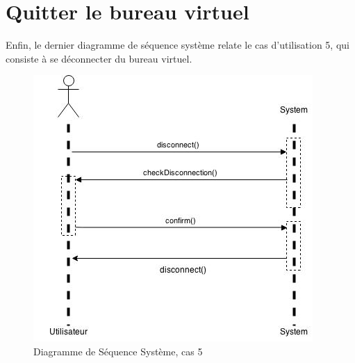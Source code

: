 \section{Quitter le bureau virtuel}

Enfin, le dernier diagramme de séquence système relate le cas d'utilisation
5, qui consiste à se déconnecter du bureau virtuel.

\begin{figure}[h!]
	\centering
	\includegraphics[scale=0.4]{diagrammes/DSS5.jpg}
	\caption{Diagramme de Séquence Système, cas 5}
\end{figure}
